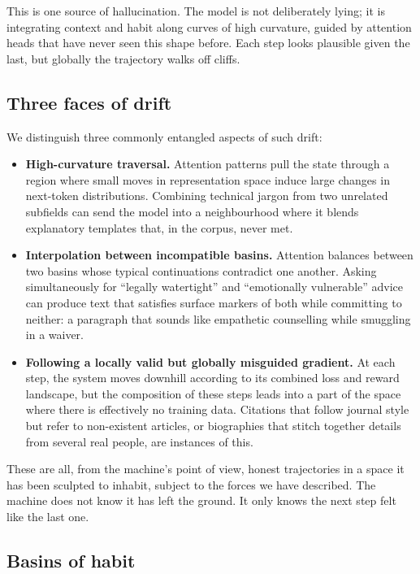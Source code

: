 \documentclass[12pt,a4paper]{article}
\begin{document}
This is one source of hallucination. The model is not deliberately lying; it is integrating context and habit along curves of high curvature, guided by attention heads that have never seen this shape before. Each step looks plausible given the last, but globally the trajectory walks off cliffs.

\subsection*{Three faces of drift}

We distinguish three commonly entangled aspects of such drift:

\begin{itemize}
  \item \textbf{High-curvature traversal.} Attention patterns pull the state through a region where small moves in representation space induce large changes in next-token distributions. Combining technical jargon from two unrelated subfields can send the model into a neighbourhood where it blends explanatory templates that, in the corpus, never met.
  \item \textbf{Interpolation between incompatible basins.} Attention balances between two basins whose typical continuations contradict one another. Asking simultaneously for ``legally watertight'' and ``emotionally vulnerable'' advice can produce text that satisfies surface markers of both while committing to neither: a paragraph that sounds like empathetic counselling while smuggling in a waiver.
  \item \textbf{Following a locally valid but globally misguided gradient.} At each step, the system moves downhill according to its combined loss and reward landscape, but the composition of these steps leads into a part of the space where there is effectively no training data. Citations that follow journal style but refer to non-existent articles, or biographies that stitch together details from several real people, are instances of this.
\end{itemize}

These are all, from the machine's point of view, honest trajectories in a space it has been sculpted to inhabit, subject to the forces we have described. The machine does not know it has left the ground. It only knows the next step felt like the last one.

\subsection*{Basins of habit}
\end{document}
